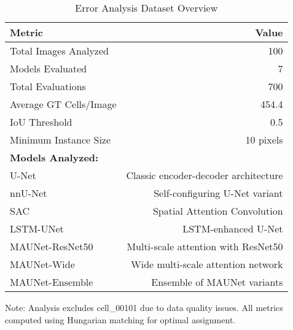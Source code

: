 \begin{table}[htbp]
\centering
\caption{Error Analysis Dataset Overview}
\label{tab:dataset_overview}
\begin{tabular}{lr}
\toprule
\textbf{Metric} & \textbf{Value} \\
\midrule
Total Images Analyzed & 100 \\
Models Evaluated & 7 \\
Total Evaluations & 700 \\
Average GT Cells/Image & 454.4 \\
IoU Threshold & 0.5 \\
Minimum Instance Size & 10 pixels \\
\midrule
\multicolumn{2}{l}{\textbf{Models Analyzed:}} \\
\quad U-Net & Classic encoder-decoder architecture \\
\quad nnU-Net & Self-configuring U-Net variant \\
\quad SAC & Spatial Attention Convolution \\
\quad LSTM-UNet & LSTM-enhanced U-Net \\
\quad MAUNet-ResNet50 & Multi-scale attention with ResNet50 \\
\quad MAUNet-Wide & Wide multi-scale attention network \\
\quad MAUNet-Ensemble & Ensemble of MAUNet variants \\
\bottomrule
\end{tabular}
\begin{tablenotes}
\small
\item Note: Analysis excludes cell\_00101 due to data quality issues. All metrics computed using Hungarian matching for optimal assignment.
\end{tablenotes}
\end{table}
